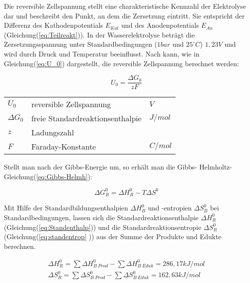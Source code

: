 \documentclass[onecolumn,10pt,titlepage]{article}
\begin{document}
Die reversible Zellspannung stellt eine charakteristische Kennzahl der Elektrolyse dar und beschreibt den Punkt, an dem die Zersetzung eintritt. Sie entspricht der Differenz des Kathodenpotentials $E_{Kat}$ und des Anodenpotentials $E_{An}$ (Gleichung(\ref{eq:Teilreakt})). In der Wasserelektrolyse beträgt die Zersetzungsspannung unter Standardbedingungen ($1bar$ und $25 ^ \circ C$) $1,23V$ und wird durch Druck und Temperatur beeinflusst. Nach \cite{Kurzweil.2015} kann, wie in Gleichung(\ref{eq:U_0}) dargestellt, die reversible Zellspannung berechnet werden:
	
	\begin{equation}
	U_0 =  \frac{\Delta G_0}{zF}	
	\label{eq:U_0}
	\end{equation}
	
	\begin{table}[H]
		\begin{tabular*}{\textwidth}{lll}\\
			$U_0$&reversible Zellspannung&$V$\\
			$\Delta G_0$&freie Standardreaktionsenthalpie&$J/mol$\\
			$z$&Ladungszahl&\\
			$F$&Faraday-Konstante&$C/mol$\\
		\end{tabular*}
	\end{table}
	
	Stellt man nach der Gibbs-Energie um, so erhält man die Gibbs-
	Helmholtz-Gleichung(\ref{eq:Gibbs-Helmh}):\cite{Bayer.2000}
	
	\begin{equation}
	\Delta G_R^0 =\Delta H_R^0 - T\Delta S^0
	\label{eq:Gibbs-Helmh}
	\end{equation}
	
	Mit Hilfe der Standardbildungsenthalpien $\Delta H_B^0$ und -entropien $\Delta S_B^0$ bei Standardbedingungen, lassen sich die Standardreaktionsenthalpie $\Delta H_R^0$ (Gleichung(\ref{eq:Standenthalp})) und die Standardreaktionsentropie $\Delta S_R^0$ (Gleichung(\ref{eq:standentrop}
	)) aus der Summe der Produkte und Edukte berechnen.
	
	\begin{align}
	\Delta H_R^0 =\sum{\Delta H_{B~Prod}^0}-\sum{\Delta H_{B~Eduk}^0} =286,17 kJ/mol \label{eq:Standenthalp}\\
	\Delta S_R^0 =\sum{\Delta S_{B~Prod}^0}-\sum{\Delta S_{B~Eduk}^0} = 162,63 kJ/mol \label{eq:standentrop}
	\end{align}
	
\end{document}
